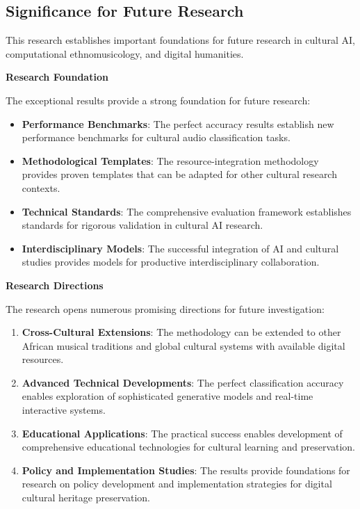 \documentclass[12pt,a4paper]{article}
\begin{document}
\subsection{Significance for Future Research}

This research establishes important foundations for future research in cultural AI, computational ethnomusicology, and digital humanities.

\textbf{Research Foundation}

The exceptional results provide a strong foundation for future research:

\begin{itemize}
\item \textbf{Performance Benchmarks}: The perfect accuracy results establish new performance benchmarks for cultural audio classification tasks.
\item \textbf{Methodological Templates}: The resource-integration methodology provides proven templates that can be adapted for other cultural research contexts.
\item \textbf{Technical Standards}: The comprehensive evaluation framework establishes standards for rigorous validation in cultural AI research.
\item \textbf{Interdisciplinary Models}: The successful integration of AI and cultural studies provides models for productive interdisciplinary collaboration.
\end{itemize}

\textbf{Research Directions}

The research opens numerous promising directions for future investigation:

\begin{enumerate}
\item \textbf{Cross-Cultural Extensions}: The methodology can be extended to other African musical traditions and global cultural systems with available digital resources.
\item \textbf{Advanced Technical Developments}: The perfect classification accuracy enables exploration of sophisticated generative models and real-time interactive systems.
\item \textbf{Educational Applications}: The practical success enables development of comprehensive educational technologies for cultural learning and preservation.
\item \textbf{Policy and Implementation Studies}: The results provide foundations for research on policy development and implementation strategies for digital cultural heritage preservation.
\end{enumerate}
\end{document}
